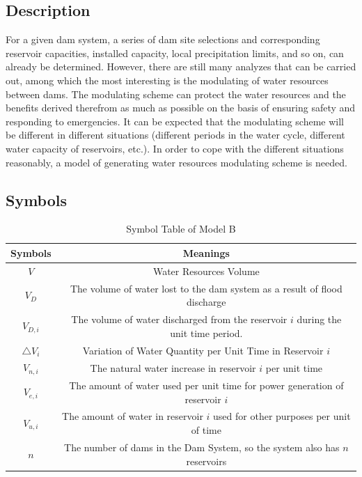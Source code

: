 \documentclass{mcmthesis}
\begin{document}
\subsection{Description}
\indent For a given dam system, a series of dam site selections and corresponding reservoir capacities, installed capacity, local precipitation limits, and so on, can already be determined. However, there are still many analyzes that can be carried out, among which the most interesting is the modulating of water resources between dams. The modulating scheme can protect the water resources and the benefits derived therefrom as much as possible on the basis of ensuring safety and responding to emergencies. It can be expected that the modulating scheme will be different in different situations (different periods in the water cycle, different water capacity of reservoirs, etc.). In order to cope with the different situations reasonably, a model of generating water resources modulating scheme is needed.\\

\subsection{Symbols}

\begin{table}[h]
\centering
  \begin{tabular}{cc}
  \hline
  Symbols & Meanings \\
  \hline
  $V$ & Water Resources Volume \\
  $V_{D}$ & The volume of water lost to the dam system as a result of flood discharge \\
  $V_{D,i}$ & The volume of water discharged from the reservoir $i$ during the unit time period.\\
  $\triangle V_{i}$ & Variation of Water Quantity per Unit Time in Reservoir $i$\\
  $V_{n, i}$ & The natural water increase in reservoir $i$ per unit time \\
  $V_{e, i}$ & The amount of water used per unit time for power generation of reservoir $i$\\
  $V_{u, i}$ & The amount of water in reservoir $i$ used for other purposes per unit of time \\
  $n$ & The number of dams in the Dam System, so the system also has $n$ reservoirs \\
  \hline
  \end{tabular}
\caption{Symbol Table of Model B}
\end{table}
\end{document}
